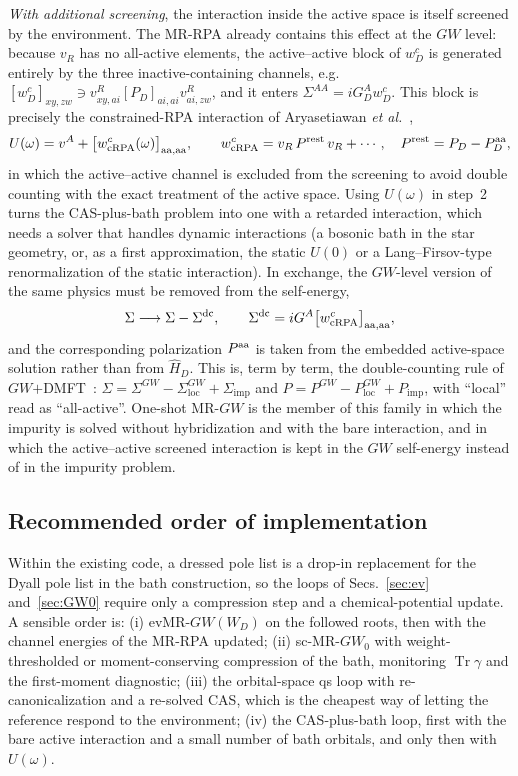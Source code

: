 \documentclass[11pt,a4paper]{article}
\newcommand{\GW}{$GW$}
\newcommand{\MRGW}{MR-$GW$}
\newcommand{\dc}{\mathrm{dc}}
\newcommand{\imp}{\mathrm{imp}}
\newcommand{\loc}{\mathrm{loc}}
\begin{document}
\emph{With additional screening}, the interaction inside the active space is
itself screened by the environment.  The MR-RPA already contains this
effect at the \GW{} level: because $v_R$ has no all-active elements, the
active--active block of $w^c_D$ is generated entirely by the three
inactive-containing channels, e.g.\
$[w^c_D]_{xy,zw}\ni v^R_{xy,ai}[P_D]_{ai,ai}v^R_{ai,zw}$, and it enters
$\Sigma^{AA}=iG^A_Dw^c_D$.  This block is precisely the constrained-RPA
interaction of Aryasetiawan \emph{et al.}~\cite{Aryasetiawan2004},
\begin{equation}
  U(\omega)=v^A+\bigl[w^c_{\rm cRPA}(\omega)\bigr]_{\rm aa,aa},
  \qquad
  w^c_{\rm cRPA}=v_R\,P^{\rm rest}\,v_R+\cdots,\quad P^{\rm rest}=P_D-P_D^{\rm aa},
  \label{eq:cRPA}
\end{equation}
in which the active--active channel is excluded from the screening to avoid
double counting with the exact treatment of the active space.  Using
$U(\omega)$ in step~2 turns the CAS-plus-bath problem into one with a
retarded interaction, which needs a solver that handles dynamic
interactions (a bosonic bath in the star geometry, or, as a first
approximation, the static $U(0)$ or a Lang--Firsov-type renormalization of
the static interaction).  In exchange, the \GW{}-level version of the same
physics must be removed from the self-energy,
\begin{equation}
  \Sigma\longrightarrow\Sigma-\Sigma^{\dc},\qquad
  \Sigma^{\dc}=iG^A\bigl[w^c_{\rm cRPA}\bigr]_{\rm aa,aa},
  \label{eq:dc}
\end{equation}
and the corresponding polarization $P^{\rm aa}$ is taken from the embedded
active-space solution rather than from $\hat H_D$.  This is, term by term,
the double-counting rule of \GW{}$+$DMFT~\cite{Biermann2003,Ayral2013}:
$\Sigma=\Sigma^{GW}-\Sigma^{GW}_{\loc}+\Sigma_{\imp}$ and
$P=P^{GW}-P^{GW}_{\loc}+P_{\imp}$, with ``local'' read as ``all-active''.
One-shot \MRGW{} is the member of this family in which the impurity is solved
without hybridization and with the bare interaction, and in which the
active--active screened interaction is kept in the \GW{} self-energy instead
of in the impurity problem.

\subsection{Recommended order of implementation}
\label{sec:practical}

Within the existing code, a dressed pole list is a drop-in replacement for
the Dyall pole list in the bath construction, so the loops of
Secs.~\ref{sec:ev} and~\ref{sec:GW0} require only a compression step and a
chemical-potential update.  A sensible order is: (i) ev\MRGW{}$(W_D)$ on the
followed roots, then with the channel energies of the MR-RPA updated;
(ii) sc-MR-$GW_0$ with weight-thresholded or moment-conserving compression
of the bath, monitoring $\operatorname{Tr}\gamma$ and the first-moment
diagnostic; (iii) the orbital-space qs loop with re-canonicalization and a
re-solved CAS, which is the cheapest way of letting the reference respond to
the environment; (iv) the CAS-plus-bath loop, first with the bare active
interaction and a small number of bath orbitals, and only then with
$U(\omega)$.
\end{document}
